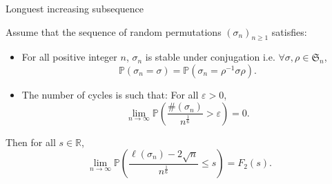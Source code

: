 \documentclass[english]{beamer}
\begin{document}
\begin{frame}{Longuest increasing subsequence}
    \begin{theorem}[\cite{sk}]
Assume that the sequence of random permutations  $(\sigma_n)_{n\geq 1}$ satisfies:
\begin{itemize}
\item  For all positive integer $n$, $\sigma_n$ is stable under conjugation i.e.  $\forall \sigma , \rho \in \mathfrak{S}_n$,
\begin{equation}\tag{H1}\label{h1}
\mathbb{P}(\sigma_n=\sigma)=\mathbb{P}(\sigma_n=\rho^{-1}\sigma\rho).
\end{equation}
\item The number of cycles is such that: For all $\varepsilon>0$,
\begin{equation}\tag{H2}\label{h2}
\lim_{n\to \infty}\mathbb{P}\left(\frac{\#(\sigma_n)}{n^\frac 16 }>\varepsilon\right) =0.
\end{equation}
\end{itemize}
Then  for all  $s \in \mathbb{R}$,
\begin{equation*} 
\lim_{n\to \infty} \mathbb{P}\left(\frac{\ell(\sigma_n)-2\sqrt{n}}{n^\frac 16}\leq s\right)=F_2(s).
\end{equation*}
\end{theorem}
\end{frame}
\end{document}
